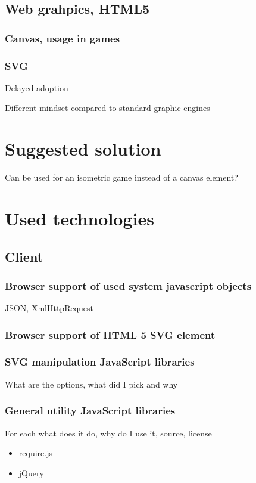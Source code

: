 \documentclass[11pt,oneside, final]{fithesis2}
\begin{document}
\section{Web grahpics, HTML5}
\subsection{Canvas, usage in games}
\subsection{SVG}
Delayed adoption

Different mindset compared to standard graphic engines

\chapter{Suggested solution}
Can be used for an isometric game instead of a canvas element?

\chapter{Used technologies}
\section{Client}

\subsection{Browser support of used system javascript objects}
JSON, XmlHttpRequest

\subsection{Browser support of HTML 5 SVG element}

\subsection{SVG manipulation JavaScript libraries}

What are the options, what did I pick and why

\subsection{General utility JavaScript libraries}
For each what does it do, why do I use it, source, license
\begin{itemize}
	\item require.js
	\item jQuery
\end{itemize}
\end{document}
